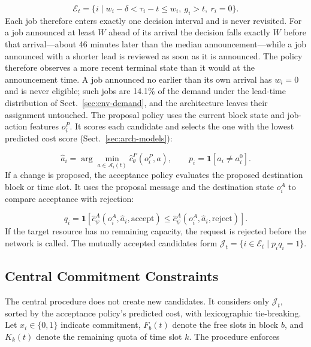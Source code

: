 \begin{equation}
\mathcal E_t=\{i\mid w_i-\delta<\tau_i-t\le w_i,\ g_i>t,\ r_i=0\}.
\end{equation}
Each job therefore enters exactly one decision interval and is never
revisited. For a job announced at least $W$ ahead of its arrival the
decision falls exactly $W$ before that arrival---about 46 minutes later
than the median announcement---while a job announced with a shorter lead
is reviewed as soon as it is announced. The policy therefore observes a
more recent terminal state than it would at the announcement time. A job announced no earlier than its own arrival has
$w_i=0$ and is never eligible; such jobs are 14.1\% of the demand under
the lead-time distribution of Sect.~\ref{sec:env-demand}, and the
architecture leaves their assignment untouched. The proposal
policy uses the current block state and job-action features $o_i^P$. It
scores each candidate and selects the one with the lowest predicted cost
score (Sect.~\ref{sec:arch-models}):

\begin{equation}
\hat a_i=\arg\min_{a\in\mathcal A_i(t)}
\hat c_{\theta}^{P}(o_i^P,a),\qquad
p_i=\mathbf 1[\hat a_i\ne a_i^0].
\end{equation}
If a change is proposed, the acceptance policy evaluates the proposed
destination block or time slot. It uses the proposal message and the
destination state $o_i^A$ to compare acceptance with rejection:

\begin{equation}
q_i=\mathbf 1\!\left[
\hat c_{\psi}^{A}(o_i^A,\hat a_i,\mathrm{accept})
\le
\hat c_{\psi}^{A}(o_i^A,\hat a_i,\mathrm{reject})
\right].
\end{equation}
If the target resource has no remaining capacity, the request is rejected
before the network is called. The mutually accepted candidates form
$\mathcal J_t=\{i\in\mathcal E_t\mid p_iq_i=1\}$.

\subsection{Central Commitment Constraints}
\label{sec:arch-commit}
The central procedure does not create new candidates. It considers only
$\mathcal J_t$, sorted by the acceptance policy's predicted cost, with
lexicographic tie-breaking. Let $x_i\in\{0,1\}$ indicate commitment,
$F_b(t)$ denote the free slots in block $b$, and $K_k(t)$ denote the
remaining quota of time slot $k$. The procedure enforces

